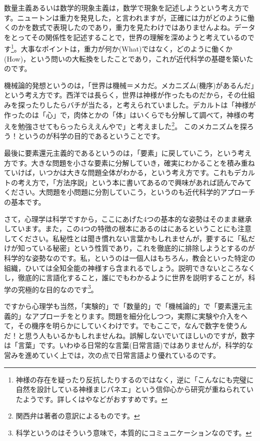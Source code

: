 \documentclass{ltjsbook}
\begin{document}
数量主義あるいは数学的現象主義は，数学で現象を記述しようという考え方です。ニュートンは重力を発見した，と言われますが，正確には力がどのように働くのかを数式で表現したのであり，重力を見たわけではありませんよね。データをとってその関係性を記述することで，世界の理解を深めようと考えているのです\footnote{神様の存在を疑ったり反抗したりするのではなく，逆に「こんなにも完璧に自然を設計している神様まじパネエ」という信仰心から研究が重ねられていたようです。詳しくは\citet{池内了2014}や\citet{蛇蔵2014}などがおすすめです。}。大事なポイントは，重力が何か(What)ではなく，どのように働くか(How)，という問いの大転換をしたことであり，これが近代科学の基礎を築いたのです。

機械論的発想というのは，「世界は機械＝メカだ。メカニズム(機序)があるんだ」という考え方です。西洋では長らく，世界は神様が作ったものだから，その仕組みを探ったりしたらバチが当たる，と考えられていました。デカルトは「神様が作ったのは「心」で，肉体とかの「体」はいくらでも分解して調べて，神様の考えを勉強させてもらったらええんやで」と考えました\footnote{関西弁は著者の意訳によるものです。}。
このメカニズムを探ろう！というのが科学の目的であるということです。

最後に要素還元主義的であるというのは，「要素」に戻していこう，という考え方です。大きな問題を小さな要素に分解していき，確実にわかることを積み重ねていけば，いつかは大きな問題全体がわかる，という考え方です。これもデカルトの考え方で，「方法序説」という本に書いてあるので興味があれば読んでみてください\citep{デカルト1997}。大問題を小問題に分割していこう，というのも近代科学的アプローチの基本です。

さて，心理学は科学ですから，ここにあげた4つの基本的な姿勢はそのまま継承しています。また，この4つの特徴の根本にあるのはにあるということにも注意してください。私秘性とは聞き慣れない言葉かもしれませんが，要するに「私だけが知っている秘密」という性質であり，これを徹底的に排除しようとするのが科学的な姿勢なのです。私，というのは一個人はもちろん，教会といった特定の組織，ひいては全知全能の神様すら含まれるでしょう。説明できないところなくし，徹底的に言語化すること，誰にでもわかるように世界を説明することが，科学の究極的な目的なのです\footnote{科学というのはそういう意味で，本質的にコミュニケーションなのです。}。

ですから心理学も当然，「実験的」で「数量的」で「機械論的」で「要素還元主義的」なアプローチをとります。問題を細分化しつつ，実際に実験や介入をへて，その機序を明らかにしていくわけです。でもここで，なんで数字を使うんだ！と思う人もいるかもしれませんね。誤解しないでいてほしいのですが，数字は「言葉」です。いわゆる日常的な言葉(日常言語)ではありませんが，科学的な営みを進めていく上では，次の点で日常言語より優れているのです。
\end{document}
